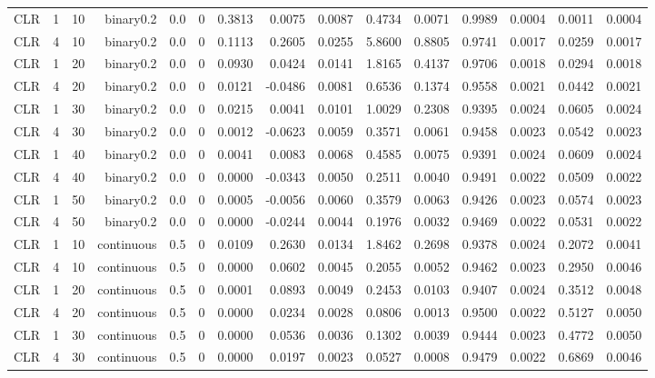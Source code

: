 \begin{longtable}{rrrrrrrrrrrrrrr}
  CLR & 1 & 10 & binary0.2 & 0.0 & 0 & 0.3813 & 0.0075 & 0.0087 & 0.4734 & 0.0071 & 0.9989 & 0.0004 & 0.0011 & 0.0004 \\ 
  CLR & 4 & 10 & binary0.2 & 0.0 & 0 & 0.1113 & 0.2605 & 0.0255 & 5.8600 & 0.8805 & 0.9741 & 0.0017 & 0.0259 & 0.0017 \\ 
  CLR & 1 & 20 & binary0.2 & 0.0 & 0 & 0.0930 & 0.0424 & 0.0141 & 1.8165 & 0.4137 & 0.9706 & 0.0018 & 0.0294 & 0.0018 \\ 
  CLR & 4 & 20 & binary0.2 & 0.0 & 0 & 0.0121 & -0.0486 & 0.0081 & 0.6536 & 0.1374 & 0.9558 & 0.0021 & 0.0442 & 0.0021 \\ 
  CLR & 1 & 30 & binary0.2 & 0.0 & 0 & 0.0215 & 0.0041 & 0.0101 & 1.0029 & 0.2308 & 0.9395 & 0.0024 & 0.0605 & 0.0024 \\ 
  CLR & 4 & 30 & binary0.2 & 0.0 & 0 & 0.0012 & -0.0623 & 0.0059 & 0.3571 & 0.0061 & 0.9458 & 0.0023 & 0.0542 & 0.0023 \\ 
  CLR & 1 & 40 & binary0.2 & 0.0 & 0 & 0.0041 & 0.0083 & 0.0068 & 0.4585 & 0.0075 & 0.9391 & 0.0024 & 0.0609 & 0.0024 \\ 
  CLR & 4 & 40 & binary0.2 & 0.0 & 0 & 0.0000 & -0.0343 & 0.0050 & 0.2511 & 0.0040 & 0.9491 & 0.0022 & 0.0509 & 0.0022 \\ 
  CLR & 1 & 50 & binary0.2 & 0.0 & 0 & 0.0005 & -0.0056 & 0.0060 & 0.3579 & 0.0063 & 0.9426 & 0.0023 & 0.0574 & 0.0023 \\ 
  CLR & 4 & 50 & binary0.2 & 0.0 & 0 & 0.0000 & -0.0244 & 0.0044 & 0.1976 & 0.0032 & 0.9469 & 0.0022 & 0.0531 & 0.0022 \\ 
  CLR & 1 & 10 & continuous & 0.5 & 0 & 0.0109 & 0.2630 & 0.0134 & 1.8462 & 0.2698 & 0.9378 & 0.0024 & 0.2072 & 0.0041 \\ 
  CLR & 4 & 10 & continuous & 0.5 & 0 & 0.0000 & 0.0602 & 0.0045 & 0.2055 & 0.0052 & 0.9462 & 0.0023 & 0.2950 & 0.0046 \\ 
  CLR & 1 & 20 & continuous & 0.5 & 0 & 0.0001 & 0.0893 & 0.0049 & 0.2453 & 0.0103 & 0.9407 & 0.0024 & 0.3512 & 0.0048 \\ 
  CLR & 4 & 20 & continuous & 0.5 & 0 & 0.0000 & 0.0234 & 0.0028 & 0.0806 & 0.0013 & 0.9500 & 0.0022 & 0.5127 & 0.0050 \\ 
  CLR & 1 & 30 & continuous & 0.5 & 0 & 0.0000 & 0.0536 & 0.0036 & 0.1302 & 0.0039 & 0.9444 & 0.0023 & 0.4772 & 0.0050 \\ 
  CLR & 4 & 30 & continuous & 0.5 & 0 & 0.0000 & 0.0197 & 0.0023 & 0.0527 & 0.0008 & 0.9479 & 0.0022 & 0.6869 & 0.0046 \\ 

\end{longtable}
